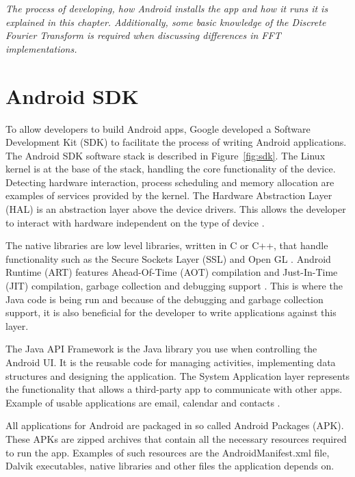 \textit{The process of developing, how Android installs the app and how it runs it is explained in this chapter. Additionally, some basic knowledge of the Discrete Fourier Transform is required when discussing differences in FFT implementations.}

\section{Android SDK}
To allow developers to build Android apps, Google developed a Software Development Kit (SDK) to facilitate the process of writing Android applications. The Android SDK software stack is described in Figure~\ref{fig:sdk}. The Linux kernel is at the base of the stack, handling the core functionality of the device. Detecting hardware interaction, process scheduling and memory allocation are examples of services provided by the kernel. The Hardware Abstraction Layer (HAL) is an abstraction layer above the device drivers. This allows the developer to interact with hardware independent on the type of device \cite{android:hal}.

The native libraries are low level libraries, written in C or C++, that handle functionality such as the Secure Sockets Layer (SSL) and Open GL \cite{komatineni2012pro}. Android Runtime (ART) features Ahead-Of-Time (AOT) compilation and Just-In-Time (JIT) compilation, garbage collection and debugging support \cite{android:sdk:stack}. This is where the Java code is being run and because of the debugging and garbage collection support, it is also beneficial for the developer to write applications against this layer.

The Java API Framework is the Java library you use when controlling the Android UI. It is the reusable code for managing activities, implementing data structures and designing the application. The System Application layer represents the functionality that allows a third-party app to communicate with other apps. Example of usable applications are email, calendar and contacts \cite{android:sdk:stack}.

All applications for Android are packaged in so called Android Packages (APK). These APKs are zipped archives that contain all the necessary resources required to run the app. Examples of such resources are the AndroidManifest.xml file, Dalvik executables, native libraries and other files the application depends on.

